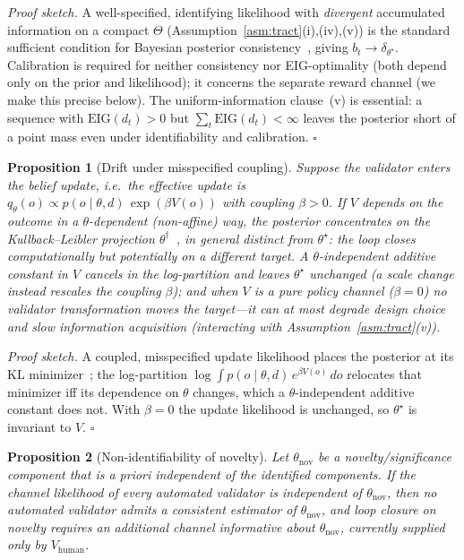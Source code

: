 \documentclass{article}
\newtheorem{proposition}{Proposition}
\begin{document}
\noindent\emph{Proof sketch.} A well-specified, identifying likelihood with \emph{divergent} accumulated information on a compact $\Theta$ (Assumption~\ref{asm:tract}(i),(iv),(v)) is the standard sufficient condition for Bayesian posterior consistency~\citep{ghosal2017fundamentals}, giving $b_t \to \delta_{\theta^\star}$. Calibration is required for neither consistency nor EIG-optimality (both depend only on the prior and likelihood); it concerns the separate reward channel (we make this precise below). The uniform-information clause~(v) is essential: a sequence with $\mathrm{EIG}(d_t)>0$ but $\sum_t \mathrm{EIG}(d_t)<\infty$ leaves the posterior short of a point mass even under identifiability and calibration. $\square$

\begin{proposition}[Drift under misspecified coupling]
\label{prop:drift}
Suppose the validator enters the belief update, i.e.\ the effective update is $q_\theta(o) \propto p(o \mid \theta, d)\,\exp(\beta V(o))$ with coupling $\beta>0$. If $V$ depends on the outcome in a $\theta$-dependent (non-affine) way, the posterior concentrates on the Kullback--Leibler projection $\theta^\dagger$~\citep{berk1966}, in general distinct from $\theta^\star$: the loop closes computationally but potentially on a different target. A $\theta$-independent additive constant in $V$ cancels in the log-partition and leaves $\theta^\star$ unchanged (a scale change instead rescales the coupling $\beta$); and when $V$ is a pure policy channel ($\beta=0$) no validator transformation moves the target---it can at most degrade design choice and slow information acquisition (interacting with Assumption~\ref{asm:tract}(v)).
\end{proposition}

\noindent\emph{Proof sketch.} A coupled, misspecified update likelihood places the posterior at its KL minimizer~\citep{berk1966}; the log-partition $\log\!\int p(o\mid\theta,d)\,e^{\beta V(o)}\,do$ relocates that minimizer iff its dependence on $\theta$ changes, which a $\theta$-independent additive constant does not. With $\beta=0$ the update likelihood is unchanged, so $\theta^\star$ is invariant to $V$. $\square$

\begin{proposition}[Non-identifiability of novelty]
\label{prop:novelty}
Let $\theta_{\mathrm{nov}}$ be a novelty/significance component that is a priori independent of the identified components. If the channel likelihood of every automated validator is independent of $\theta_{\mathrm{nov}}$, then no automated validator admits a consistent estimator of $\theta_{\mathrm{nov}}$, and loop closure on novelty requires an additional channel informative about $\theta_{\mathrm{nov}}$, currently supplied only by $V_{\mathrm{human}}$.
\end{proposition}
\end{document}
